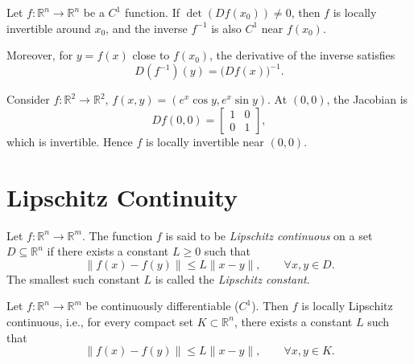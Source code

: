 \begin{theorem}
Let $f:\mathbb{R}^n\to \mathbb{R}^n$ be a $C^1$ function.  
If $\det(Df(x_0))\neq 0$, then $f$ is locally invertible around $x_0$, and the inverse $f^{-1}$ is also $C^1$ near $f(x_0)$.  

Moreover, for $y=f(x)$ close to $f(x_0)$, the derivative of the inverse satisfies
\[
D(f^{-1})(y) = \big(Df(x)\big)^{-1}.
\]
\end{theorem}


\begin{example}
Consider $f:\mathbb{R}^2\to \mathbb{R}^2$, $f(x,y)=(e^x \cos y, e^x \sin y)$.  
At $(0,0)$, the Jacobian is 
\[
Df(0,0)=\begin{bmatrix}1&0\\0&1\end{bmatrix},
\]
which is invertible. Hence $f$ is locally invertible near $(0,0)$.
\end{example}

\section{Lipschitz Continuity}

\begin{definition}
    Let $f: \mathbb{R}^n \to \mathbb{R}^m$.  
    The function $f$ is said to be \emph{Lipschitz continuous} on a set $D \subseteq \mathbb{R}^n$ if there exists a constant $L \geq 0$ such that
    \begin{equation}
        \| f(x) - f(y) \| \leq L \| x - y \|, \qquad \forall x,y \in D.
    \end{equation}
    The smallest such constant $L$ is called the \emph{Lipschitz constant}.
\end{definition}


\begin{theorem}
    Let $f: \mathbb{R}^n \to \mathbb{R}^m$ be continuously differentiable ($C^1$).  
    Then $f$ is locally Lipschitz continuous, i.e., for every compact set $K \subset \mathbb{R}^n$, there exists a constant $L$ such that
    \[
        \| f(x) - f(y) \| \leq L \| x - y \|, \qquad \forall x,y \in K.
    \]
\end{theorem}


